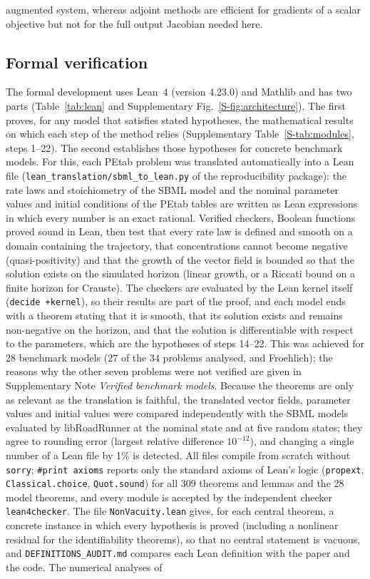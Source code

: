 \documentclass[pdflatex,sn-nature]{sn-jnl}
\theoremstyle{plain}
\begin{document}
augmented system, whereas adjoint methods are efficient for gradients of a scalar objective but not for the full output Jacobian needed here.

\subsection*{Formal verification}\label{met:formal}

The formal development uses Lean~4 (version 4.23.0) and Mathlib\cite{bib19,bib21} and has two parts (Table~\ref{tab:lean} and Supplementary Fig.~\ref{S-fig:architecture}). The first proves, for any model that satisfies stated hypotheses, the mathematical results on which each step of the method relies (Supplementary Table~\ref{S-tab:modules}, steps 1--22). The second establishes those hypotheses for concrete benchmark models. For this, each PEtab problem was translated automatically into a Lean file (\texttt{lean\_translation/sbml\_to\_lean.py} of the reproducibility package): the rate laws and stoichiometry of the SBML model and the nominal parameter values and initial conditions of the PEtab tables are written as Lean expressions in which every number is an exact rational. Verified checkers, Boolean functions proved sound in Lean, then test that every rate law is defined and smooth on a domain containing the trajectory, that concentrations cannot become negative (quasi-positivity) and that the growth of the vector field is bounded so that the solution exists on the simulated horizon (linear growth, or a Riccati bound on a finite horizon for Crauste). The checkers are evaluated by the Lean kernel itself (\texttt{decide +kernel}), so their results are part of the proof, and each model ends with a theorem stating that it is smooth, that its solution exists and remains non-negative on the horizon, and that the solution is differentiable with respect to the parameters, which are the hypotheses of steps 14--22. This was achieved for 28 benchmark models (27 of the 34 problems analysed, and Froehlich); the reasons why the other seven problems were not verified are given in Supplementary Note \textit{Verified benchmark models}. Because the theorems are only as relevant as the translation is faithful, the translated vector fields, parameter values and initial values were compared independently with the SBML models evaluated by libRoadRunner at the nominal state and at five random states; they agree to rounding error (largest relative difference $10^{-12}$), and changing a single number of a Lean file by 1\% is detected. All files compile from scratch without \texttt{sorry}; \texttt{\#print axioms} reports only the standard axioms of Lean's logic (\texttt{propext}, \texttt{Classical.choice}, \texttt{Quot.sound}) for all 309 theorems and lemmas and the 28 model theorems, and every module is accepted by the independent checker \texttt{lean4checker}. The file \texttt{NonVacuity.lean} gives, for each central theorem, a concrete instance in which every hypothesis is proved (including a nonlinear residual for the identifiability theorems), so that no central statement is vacuous, and \texttt{DEFINITIONS\_AUDIT.md} compares each Lean definition with the paper and the code. The numerical analyses of 
\end{document}
